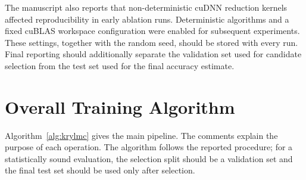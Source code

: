 \documentclass[11pt,a4paper]{article}
\begin{document}
The manuscript also reports that non-deterministic cuDNN reduction kernels affected reproducibility in early ablation runs. Deterministic algorithms and a fixed cuBLAS workspace configuration were enabled for subsequent experiments. These settings, together with the random seed, should be stored with every run. Final reporting should additionally separate the validation set used for candidate selection from the test set used for the final accuracy estimate.

\clearpage
\section{Overall Training Algorithm}

Algorithm~\ref{alg:krylmc} gives the main pipeline. The comments explain the purpose of each operation. The algorithm follows the reported procedure; for a statistically sound evaluation, the selection split should be a validation set and the final test set should be used only after selection.
\end{document}
